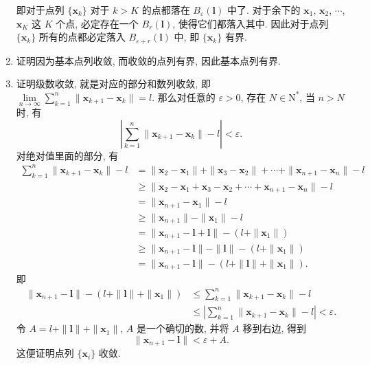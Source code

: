 \begin{enumerate}
\[        \]
        即对于点列 $\{\boldsymbol{x}_k\}$ 对于 $k > K$ 的点都落在 $B_\varepsilon(\boldsymbol{l})$ 中了.
        对于余下的 $\boldsymbol{x}_1$, $\boldsymbol{x}_2$, $\cdots$, $\boldsymbol{x}_K$ 这 $K$ 个点, 必定存在一个 $B_r(\boldsymbol{l})$, 使得它们都落入其中.
        因此对于点列 $\{\boldsymbol{x}_k\}$ 所有的点都必定落入 $B_{\varepsilon + r}(\boldsymbol{l})$ 中, 即 $\{\boldsymbol{x}_k\}$ 有界.
    \item %
        {\heiti 证明}\quad 因为基本点列收敛, 而收敛的点列有界, 因此基本点列有界.
    \item %
        {\heiti 证明}\quad 级数收敛, 就是对应的部分和数列收敛, 即 $\lim\limits_{n\to\infty} \sum\limits_{k=1}^n \| \boldsymbol{x}_{k+1} - \boldsymbol{x}_k \| = l$.
        那么对任意的 $\varepsilon > 0$, 存在 $N \in \mathrm{N}^*$, 当 $n>N$ 时, 有
        \[
            \left| \sum_{k=1}^n\| \boldsymbol{x}_{k+1} - \boldsymbol{x}_k \| - l \right| < \varepsilon.   
        \]
        对绝对值里面的部分, 有
        \begin{align*}
            \sum_{k=1}^n\| \boldsymbol{x}_{k+1} - \boldsymbol{x}_k \| - l &= \| \boldsymbol{x}_2 - \boldsymbol{x}_1 \| + \| \boldsymbol{x}_3 - \boldsymbol{x}_2 \| + \cdots + \| \boldsymbol{x}_{n+1} - \boldsymbol{x}_n \| - l \\
            &\geqslant \| \boldsymbol{x}_2 - \boldsymbol{x}_1 + \boldsymbol{x}_3 - \boldsymbol{x}_2 + \cdots + \boldsymbol{x}_{n+1} - \boldsymbol{x}_n \| - l \\
            &= \| \boldsymbol{x}_{n+1} - \boldsymbol{x}_1 \| - l \\
            &\geqslant \| \boldsymbol{x}_{n+1} \| - \| \boldsymbol{x}_1 \| - l \\
            &= \| \boldsymbol{x}_{n+1} - \boldsymbol{l} + \boldsymbol{l} \| - (l + \|\boldsymbol{x}_1\|) \\
            &\geqslant \| \boldsymbol{x}_{n+1} - \boldsymbol{l} \| - \| \boldsymbol{l} \| - (l + \|\boldsymbol{x}_1\|) \\
            &= \| \boldsymbol{x}_{n+1} - \boldsymbol{l} \| - (l + \|\boldsymbol{l}\| + \|\boldsymbol{x}_1\|).
        \end{align*}
        即
        \begin{align*}
            \| \boldsymbol{x}_{n+1} - \boldsymbol{l} \| - (l + \|\boldsymbol{l}\| + \|\boldsymbol{x}_1\|) &\leqslant \sum_{k=1}^n\| \boldsymbol{x}_{k+1} - \boldsymbol{x}_k \| - l \\
            &\leqslant \left|\sum_{k=1}^n\| \boldsymbol{x}_{k+1} - \boldsymbol{x}_k \| - l\right| < \varepsilon.
        \end{align*}
        令 $A = l + \|\boldsymbol{l}\| + \|\boldsymbol{x}_1\|$, $A$ 是一个确切的数, 并将 $A$ 移到右边, 得到
        \[
            \| \boldsymbol{x}_{n+1} - \boldsymbol{l} \| < \varepsilon + A.     
        \]
        这便证明点列 $\{\boldsymbol{x}_i\}$ 收敛.
\end{enumerate}
% 